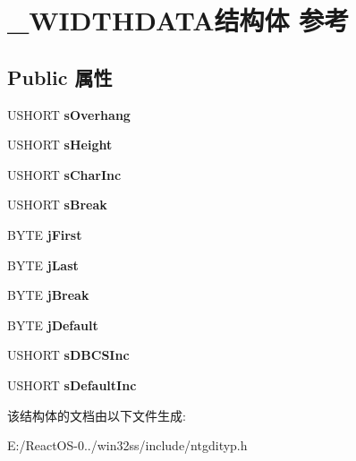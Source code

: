 \hypertarget{struct___w_i_d_t_h_d_a_t_a}{}\section{\+\_\+\+W\+I\+D\+T\+H\+D\+A\+T\+A结构体 参考}
\label{struct___w_i_d_t_h_d_a_t_a}
\subsection*{Public 属性}
\begin{DoxyCompactItemize}
\item 
\mbox{\label{struct___w_i_d_t_h_d_a_t_a_ad439b4ff357481fce6a0c56d48a72de8}} 
U\+S\+H\+O\+RT {\bfseries s\+Overhang}
\item 
\mbox{\label{struct___w_i_d_t_h_d_a_t_a_a01da64d81f7e478026f2f1358a87832a}} 
U\+S\+H\+O\+RT {\bfseries s\+Height}
\item 
\mbox{\label{struct___w_i_d_t_h_d_a_t_a_a8f19ca04ed95aefc4c0afb57d046e24b}} 
U\+S\+H\+O\+RT {\bfseries s\+Char\+Inc}
\item 
\mbox{\label{struct___w_i_d_t_h_d_a_t_a_a6d5bb3122c79f85df6271d88225fb5d3}} 
U\+S\+H\+O\+RT {\bfseries s\+Break}
\item 
\mbox{\label{struct___w_i_d_t_h_d_a_t_a_a43a57be3fd875b245c9f11b41fb9d46b}} 
B\+Y\+TE {\bfseries j\+First}
\item 
\mbox{\label{struct___w_i_d_t_h_d_a_t_a_ad89bfff688e3da94e14b94e16379a79b}} 
B\+Y\+TE {\bfseries j\+Last}
\item 
\mbox{\label{struct___w_i_d_t_h_d_a_t_a_a9e0bacb6d5ddb39e9034b7d64d9be3ed}} 
B\+Y\+TE {\bfseries j\+Break}
\item 
\mbox{\label{struct___w_i_d_t_h_d_a_t_a_a1b79044aaa4fdcbe0d53e630cbec694e}} 
B\+Y\+TE {\bfseries j\+Default}
\item 
\mbox{\label{struct___w_i_d_t_h_d_a_t_a_a0773a72ff7d5e33e594922373e62da11}} 
U\+S\+H\+O\+RT {\bfseries s\+D\+B\+C\+S\+Inc}
\item 
\mbox{\label{struct___w_i_d_t_h_d_a_t_a_a3a9ce56a2ab4cb83b9117b5015efdb5c}} 
U\+S\+H\+O\+RT {\bfseries s\+Default\+Inc}
\end{DoxyCompactItemize}


该结构体的文档由以下文件生成\+:\begin{DoxyCompactItemize}
\item 
E\+:/\+React\+O\+S-\/0../win32ss/include/ntgdityp.\+h\end{DoxyCompactItemize}
